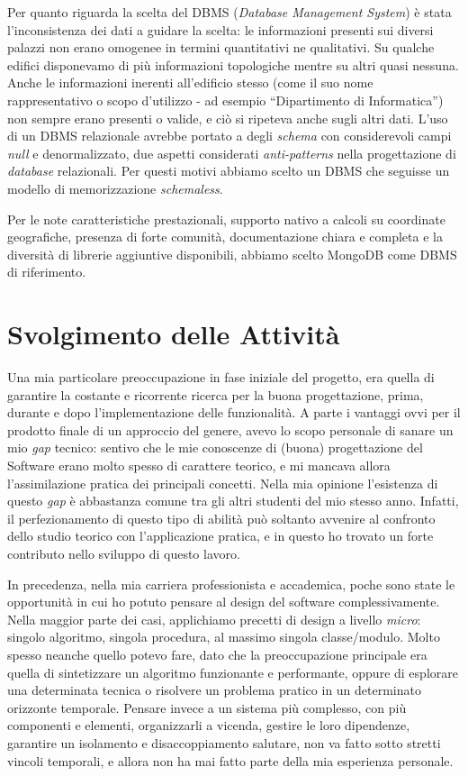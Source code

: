 \documentclass[12pt]{report}
\begin{document}
Per quanto riguarda la scelta del DBMS (\textit{Database Management System}) è stata l'inconsistenza dei dati a guidare la scelta: le informazioni presenti sui diversi palazzi non erano omogenee in termini quantitativi ne qualitativi. Su qualche edifici disponevamo di più informazioni topologiche mentre su altri quasi nessuna. Anche le informazioni inerenti all'edificio stesso (come il suo nome rappresentativo o scopo d'utilizzo - ad esempio ``Dipartimento di Informatica'') non sempre erano presenti o valide, e ciò si ripeteva anche sugli altri dati. L'uso di un DBMS relazionale avrebbe portato a degli \textit{schema} con considerevoli campi \textit{null} e denormalizzato, due aspetti considerati \textit{anti-patterns} nella progettazione di \textit{database} relazionali. Per questi motivi abbiamo scelto un DBMS che seguisse un modello di memorizzazione \textit{schemaless}. 

Per le note caratteristiche prestazionali, supporto nativo a calcoli su coordinate geografiche, presenza di forte comunità, documentazione chiara e completa e la diversità di librerie aggiuntive disponibili, abbiamo scelto MongoDB come DBMS di riferimento.

% 
% 
\chapter{Svolgimento delle Attività}
\label{cap3}

Una mia particolare preoccupazione in fase iniziale del progetto, era quella di garantire la costante e ricorrente ricerca per la buona progettazione, prima, durante e dopo l'implementazione delle funzionalità. A parte i vantaggi ovvi per il prodotto finale di un approccio del genere, avevo lo scopo personale di sanare un mio \textit{gap} tecnico: sentivo che le mie conoscenze di (buona) progettazione del Software erano molto spesso di carattere teorico, e mi mancava allora l'assimilazione pratica dei principali concetti. Nella mia opinione l'esistenza di questo \textit{gap} è abbastanza comune tra gli altri studenti del mio stesso anno. Infatti, il perfezionamento di questo tipo di abilità può soltanto avvenire al confronto dello studio teorico con l'applicazione pratica, e in questo ho trovato un forte contributo nello sviluppo di questo lavoro.

In precedenza, nella mia carriera professionista e accademica, poche sono state le opportunità in cui ho potuto pensare al design del software complessivamente. Nella maggior parte dei casi, applichiamo precetti di design a livello \textit{micro}: singolo algoritmo, singola procedura, al massimo singola classe/modulo. Molto spesso neanche quello potevo fare, dato che la preoccupazione principale era quella di sintetizzare un algoritmo funzionante e performante, oppure di esplorare una determinata tecnica o risolvere un problema pratico in un determinato orizzonte temporale. Pensare invece a un sistema più complesso, con più componenti e elementi, organizzarli a vicenda, gestire le loro dipendenze, garantire un isolamento e disaccoppiamento salutare, non va fatto sotto stretti vincoli temporali, e allora non ha mai fatto parte della mia esperienza personale. 
\end{document}
